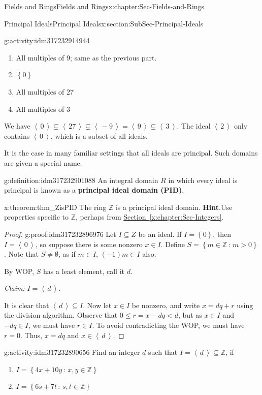 \documentclass[oneside,10pt,]{book}
\newcommand{\blocktitlefont}{\relax}
\newcommand{\xreffont}{\relax}
\newcommand{\terminology}[1]{\textbf{#1}}
\numberwithin{equation}{section}
\renewcommand{\le}{\leqslant}
\newcommand{\ideal}[1]{\left\langle\, #1 \,\right\rangle}
\newcommand{\set}[1]{\left\{ {#1} \right\}}
\newcommand{\setof}[2]{{\left\{#1\,\colon\,#2\right\}}}
\def\Z{{\mathbb Z}}
\newcommand{\lt}{<}
\begin{document}
\begin{chapterptx}{Fields and Rings}{}{Fields and Rings}{}{}{x:chapter:Sec-Fields-and-Rings}
\begin{sectionptx}{Principal Ideals}{}{Principal Ideals}{}{}{x:section:SubSec-Principal-Ideals}
\begin{activity}{}{g:activity:idm317232914944}
\begin{enumerate}
\item{}All multiples of 9; same as the previous part.%
\item{}\(\set{0}\)%
\item{}All multiples of 27%
\item{}All multiples of 3%
\end{enumerate}
We have \(\ideal{0}\subsetneq \ideal{27}\subsetneq \ideal{-9} = \ideal{9} \subsetneq \ideal{3}\). The ideal \(\ideal{2}\) only contains \(\ideal{0}\), which is a subset of all ideals.%
\end{activity}
It is the case in many familiar settings that all ideals are principal. Such domains are given a special name.%
\begin{definition}{}{g:definition:idm317232901088}%
An integral domain \(R\) in which every ideal is principal is known as a \terminology{principal ideal domain (PID)}.%
\end{definition}
\begin{theorem}{}{}{x:theorem:thm_ZisPID}%
The ring \(\Z\) is a principal ideal domain.%
\textbf{\blocktitlefont Hint}.\quad{}Use properties specific to \(\Z\), perhaps from \hyperref[x:chapter:Sec-Integers]{Section~{\xreffont\ref{x:chapter:Sec-Integers}}}.%
\end{theorem}
\begin{proof}{}{g:proof:idm317232896976}
Let \(I\subseteq Z\) be an ideal. If \(I = \set{0}\), then \(I = \ideal{0}\), so suppose there is some nonzero \(x\in I\). Define \(S = \setof{m\in \Z}{m > 0}\). Note that \(S\ne \emptyset\), as if \(m\in I\), \((-1)m \in I\) also.%
\par
By WOP, \(S\) has a least element, call it \(d\).%
\par
\emph{Claim:} \(I = \ideal{d}\).%
\par
It is clear that \(\ideal{d}\subseteq I\). Now let \(x\in I\) be nonzero, and write \(x = dq + r\) using the division algorithm. Observe that \(0 \le r = x - dq \lt d\), but as \(x\in I\) and \(-dq \in I\), we must have \(r\in I\). To avoid contradicting the WOP, we must have \(r = 0\). Thus, \(x = dq\) and \(x\in \ideal{d}\).%
\end{proof}
\begin{activity}{}{g:activity:idm317232890656}%
Find an integer \(d\) such that \(I = \ideal{d}\subseteq \Z\), if%
\begin{enumerate}
\item{}\(I = \setof{4x+10y}{x,y\in\Z}\)%
\item{}\(I = \setof{6s+7t}{s,t\in\Z}\)%

\end{enumerate}
\end{activity}
\end{sectionptx}
\end{chapterptx}
\end{document}
